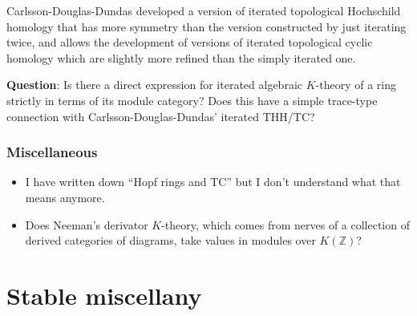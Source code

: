 \documentclass[12pt,titlepage]{article}
\theoremstyle{plain}
\theoremstyle{definition}
\theoremstyle{remark}
\begin{document}
Carlsson-Douglas-Dundas developed a version of iterated topological Hochschild homology that has more symmetry than the version constructed by just iterating twice, and allows the development of versions of iterated topological cyclic homology which are slightly more refined than the simply iterated one.

\textbf{Question}: Is there a direct expression for iterated algebraic $K$-theory of a ring strictly in terms of its module category? Does this have a simple trace-type connection with Carlsson-Douglas-Dundas'{} iterated THH/TC?

\hypertarget{miscellaneous_5}{}\subsubsection{{Miscellaneous}}\label{miscellaneous_5}

\begin{itemize}%
\item I have written down ``{}Hopf rings and TC''{} but I don'{}t understand what that means anymore.


\item Does Neeman'{}s derivator $K$-theory, which comes from nerves of a collection of derived categories of diagrams, take values in modules over $K(\mathbb{Z})$?



\end{itemize}
\section{Stable miscellany}
\end{document}
